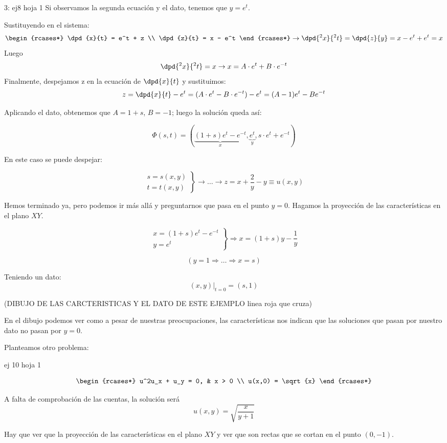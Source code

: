 \begin{example}{3: ej8 hoja 1}
		Si observamos la segunda ecuación y el dato, tenemos que $ y = e^t $.

		Sustituyendo en el sistema:
		\[
		\begin{rcases*}
			 \dpd{x}{t} = e^t + z  \\
			 \dpd{z}{t} = x - e^t
		\end{rcases*}
		\rightarrow \dpd{^2 x}{^2 t} = \dpd{z}{y} = x - e^t + e^t = x
		\]
		Luego
		$$\dpd{^2 x}{^2 t} = x \rightarrow x = A \cdot e^t + B \cdot e^{-t}$$
		Finalmente, despejamos z en la ecuación de $\dpd{x}{t}$ y sustituimos:
		$$z = \dpd{x}{t} - e^t = (A \cdot e^t - B \cdot e^{-t}) - e^t = (A-1)e^t - B e^{-t}$$

		Aplicando el dato, obtenemos que $A=1+s$, $B=-1$; luego la solución queda así:

		\[ \Phi(s,t) = (\underbrace{(1+s)e^t-e^{-t}}_{x},\underbrace{e^t}_{y}, s\cdot e^t + e^{-t}) \]

		En este caso se puede despejar:

		\[  \left. \begin{array}{r}
		s = s(x,y) \\
		t = t(x,y)
		\end{array}
		\right\}\rightarrow \dots \rightarrow z = x + \frac{2}{y} - y \equiv u(x,y)
		\]

		Hemos terminado ya, pero podemos ir más allá y preguntarnos que pasa en el punto $y = 0$. Hagamos la proyección de las características en el plano $XY$.

		\[
		\left.
		\begin{array}{l}
			x = (1+s)e^t - e^{-t} \\
			y = e^{t}
		\end{array}
		\right\}
		\Rightarrow x = (1+s) y - \frac{1}{y}
		\]

		\[ (y = 1 \Rightarrow … \Rightarrow x = s )\]

		Teniendo un dato: \[ (x,y) |_{t=0} = (s,1) \]

		(DIBUJO DE LAS CARCTERISTICAS Y EL DATO DE ESTE EJEMPLO linea roja que cruza)

		En el dibujo podemos ver como a pesar de nuestras preocupaciones, las características nos indican que las soluciones que pasan por nuestro dato no pasan por $y=0$.

	\end{example}

	Planteamos otro problema:

	\begin{example}{ej 10 hoja 1}

		\[
		\begin{rcases*}
			u^2u_x + u_y = 0, & x > 0 \\
			u(x,0) = \sqrt{x}
		\end{rcases*}
		 \]

		A falta de comprobación de las cuentas, la solución será \[u(x,y) = \sqrt{\frac{x}{y+1}} \]

		Hay que ver que la proyección de las características en el plano $XY$ y ver que son rectas que se cortan en el punto $(0,-1)$.

	\end{example}

